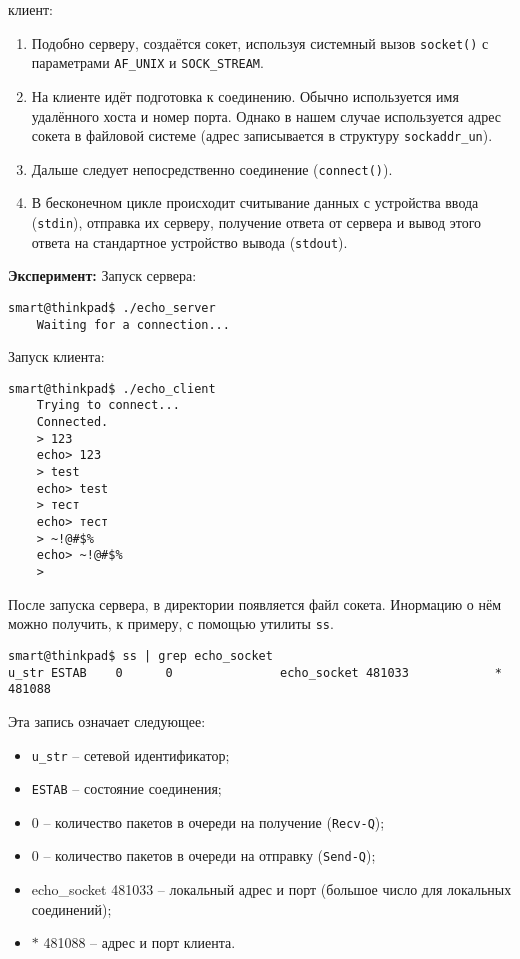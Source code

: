 клиент:
\begin{enumerate}
\item Подобно серверу, создаётся сокет, используя системный вызов \texttt{socket()} с параметрами \texttt{AF\_UNIX} и \texttt{SOCK\_STREAM}.
\item На клиенте идёт подготовка к соединению. Обычно используется имя удалённого хоста и номер порта. Однако в нашем случае используется адрес сокета в файловой системе (адрес записывается в структуру \texttt{sockaddr\_un}).
\item Дальше следует непосредственно соединение (\texttt{connect()}).
\item В бесконечном цикле происходит считывание данных с устройства ввода (\texttt{stdin}), отправка их серверу, получение ответа от сервера и вывод этого ответа на стандартное устройство вывода (\texttt{stdout}).
\end{enumerate}

\textbf{Эксперимент:} Запуск сервера:
\begin{Verbatim}[frame=single,breaklines=true,breakanywhere=true]
    smart@thinkpad$ ./echo_server
    Waiting for a connection...
\end{Verbatim}

Запуск клиента:
\begin{Verbatim}[frame=single,breaklines=true,breakanywhere=true]
    smart@thinkpad$ ./echo_client
    Trying to connect...
    Connected.
    > 123
    echo> 123
    > test
    echo> test
    > тест
    echo> тест
    > ~!@#$%
    echo> ~!@#$%
    > 
\end{Verbatim}

После запуска сервера, в директории появляется файл сокета. Инормацию о нём можно получить, к примеру, с помощью утилиты \texttt{ss}.
\begin{Verbatim}[frame=single,breaklines=true,breakanywhere=true]
smart@thinkpad$ ss | grep echo_socket
u_str ESTAB    0      0               echo_socket 481033            * 481088
\end{Verbatim}
Эта запись означает следующее:
\begin{itemize}
    \item \texttt{u\_str} -- сетевой идентификатор;
    \item \texttt{ESTAB} -- состояние соединения;
    \item 0 -- количество пакетов в очереди на получение (\texttt{Recv-Q});
    \item 0 -- количество пакетов в очереди на отправку (\texttt{Send-Q});
    \item echo\_socket 481033 -- локальный адрес и порт (большое число для локальных соединений);
    \item $\ast{}$ 481088 -- адрес и порт клиента.
\end{itemize}

